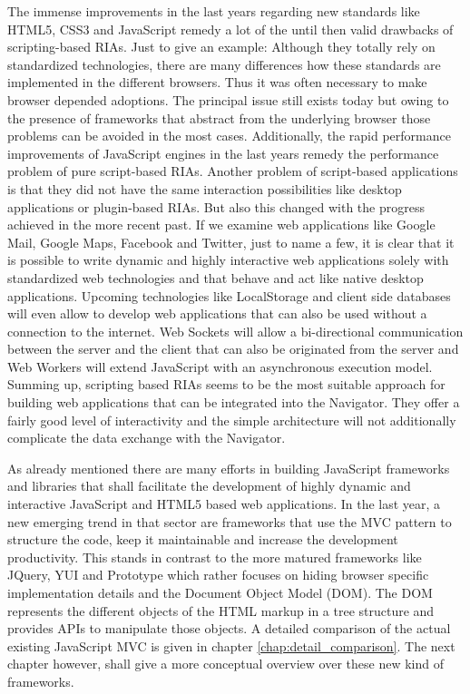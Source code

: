 The immense improvements in the last years regarding new standards like HTML5, CSS3 and JavaScript remedy a lot of the until then valid drawbacks of scripting-based RIAs.
Just to give an example: Although they totally rely on standardized technologies, there are many differences how these standards are implemented in the different browsers.
Thus it was often necessary to make browser depended adoptions.
The principal issue still exists today but owing to the presence of frameworks that abstract from the underlying browser those problems can be avoided in the most cases.
Additionally, the rapid performance improvements of JavaScript engines in the last years remedy the performance problem of pure script-based RIAs.
Another problem of script-based applications is that they did not have the same interaction possibilities like desktop applications or plugin-based RIAs.
But also this changed with the progress achieved in the more recent past.
If we examine web applications like Google Mail, Google Maps, Facebook and Twitter, just to name a few, it is clear that it is possible to write dynamic and highly interactive web applications solely with standardized web technologies and that behave and act like native desktop applications.
Upcoming technologies like LocalStorage and client side databases will even allow to develop web applications that can also be used without a connection to the internet.
Web Sockets will allow a bi-directional communication between the server and the client that can also be originated from the server and Web Workers will extend JavaScript with an asynchronous execution model.
Summing up, scripting based RIAs seems to be the most suitable approach for building web applications that can be integrated into the Navigator. 
They offer a fairly good level of interactivity and the simple architecture will not additionally complicate the data exchange with the Navigator. 

As already mentioned there are many efforts in building JavaScript frameworks and libraries that shall facilitate the development of highly dynamic and interactive JavaScript and HTML5 based web applications.
In the last year, a new emerging trend in that sector are frameworks that use the MVC pattern to structure the code, keep it maintainable and increase the development productivity.
This stands in contrast to the more matured frameworks like JQuery, YUI and Prototype which rather focuses on hiding browser specific implementation details and the Document Object Model (DOM). 
The DOM represents the different objects of the HTML markup in a tree structure and provides APIs to manipulate those objects.
A detailed comparison of the actual existing JavaScript MVC is given in chapter \ref{chap:detail_comparison}.
The next chapter however, shall give a more conceptual overview over these new kind of frameworks.
 
